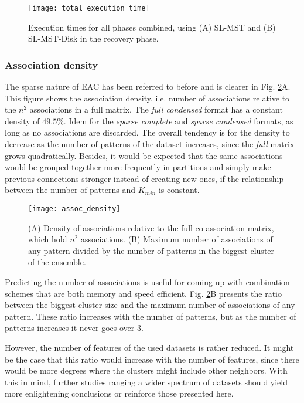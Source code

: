 \begin{figure}[hbt!]
    \centering
    \texttt{[image: total\_execution\_time]}
    \caption{Execution times for all phases combined, using (A) SL-MST and (B) SL-MST-Disk in the recovery phase.}
    \label{fig:eac total}
\end{figure}

\subsubsection{Association density}

\noindent The sparse nature of EAC has been referred to before and is clearer in Fig. \ref{fig:eac assoc density}A.
This figure shows the association density, i.e. number of associations relative to the $n^2$ associations in a full matrix.
The \emph{full condensed} format has a constant density of $49.5\%$.
Idem for the \emph{sparse complete} and \emph{sparse condensed} formats, as long as no associations are discarded.
The overall tendency is for the density to decrease as the number of patterns of the dataset increases, since the \emph{full} matrix grows quadratically.
Besides, it would be expected that the same associations would be grouped together more frequently in partitions and simply make previous connections stronger instead of creating new ones, if the relationship between the number of patterns and $K_{min}$ is constant.

\begin{figure}[hbt!]
    \centering
    \texttt{[image: assoc\_density]}
    \caption{(A) Density of associations relative to the full co-association matrix, which hold $n^2$ associations. (B) Maximum number of associations of any pattern divided by the number of patterns in the biggest cluster of the ensemble.}
    \label{fig:eac assoc density}
\end{figure}

Predicting the number of associations is useful for coming up with combination schemes that are both memory and speed efficient. %
Fig. \ref{fig:eac assoc density}B presents the ratio between the biggest cluster size and the maximum number of associations of any pattern.
These ratio increases with the number of patterns, but as the number of patterns increases it never goes over 3. %

However, the number of features of the used datasets is rather reduced.
It might be the case that this ratio would increase with the number of features, since there would be more degrees where the clusters might include other neighbors.
With this in mind, further studies ranging a wider spectrum of datasets should yield more enlightening conclusions or reinforce those presented here.

